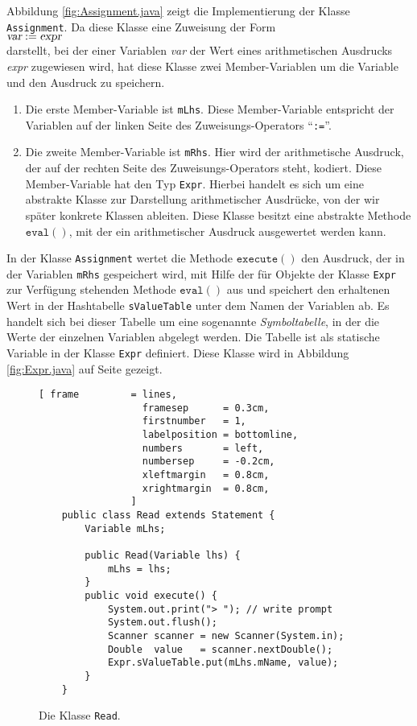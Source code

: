 Abbildung \ref{fig:Assignment.java} zeigt die Implementierung der Klasse \texttt{Assignment}.  Da
diese Klasse eine Zuweisung der Form
\\[0.2cm]
\hspace*{1.3cm} $\textsl{var} \;\mathtt{:=}\; \textsl{expr}$
\\[0.2cm]
darstellt, bei der einer Variablen \textsl{var} der Wert eines arithmetischen Ausdrucks
\textsl{expr} zugewiesen wird, hat diese Klasse zwei Member-Variablen um die Variable und den
Ausdruck zu speichern.  
\begin{enumerate}
\item Die erste Member-Variable ist \texttt{mLhs}.  Diese
      Member-Variable entspricht der Variablen auf der linken Seite des Zuweisungs-Operators
      ``\texttt{:=}''.
\item Die zweite Member-Variable ist \texttt{mRhs}.  Hier wird der arithmetische Ausdruck,
      der auf der rechten Seite des Zuweisungs-Operators steht, kodiert.  Diese
      Member-Variable hat den Typ \texttt{Expr}.  Hierbei handelt es sich um eine
      abstrakte Klasse zur Darstellung arithmetischer Ausdr\"ucke, von der wir sp\"ater
      konkrete Klassen ableiten.  Diese Klasse besitzt eine abstrakte Methode
      $\texttt{eval}()$, mit der ein arithmetischer Ausdruck ausgewertet werden kann.
\end{enumerate}
In der Klasse \texttt{Assignment} wertet die Methode $\texttt{execute}()$ den Ausdruck,
der in der Variablen \texttt{mRhs} gespeichert wird, mit Hilfe  der f\"ur Objekte der Klasse
\texttt{Expr} zur Verf\"ugung stehenden 
Methode $\texttt{eval}()$ aus und speichert den erhaltenen Wert in der Hashtabelle
\texttt{sValueTable} unter dem Namen der Variablen ab. 
Es handelt sich bei dieser Tabelle um eine sogenannte \emph{Symboltabelle}, in der die
Werte der einzelnen Variablen abgelegt werden.
Die Tabelle ist als statische Variable in der Klasse \texttt{Expr} definiert.
Diese Klasse wird in Abbildung \ref{fig:Expr.java} auf Seite \pageref{fig:Expr.java} gezeigt.


\begin{figure}[!ht]
\centering
\begin{Verbatim}[ frame         = lines, 
                  framesep      = 0.3cm, 
                  firstnumber   = 1,
                  labelposition = bottomline,
                  numbers       = left,
                  numbersep     = -0.2cm,
                  xleftmargin   = 0.8cm,
                  xrightmargin  = 0.8cm,
                ]
    public class Read extends Statement {
        Variable mLhs;
        
        public Read(Variable lhs) {
            mLhs = lhs;
        }
        public void execute() {
            System.out.print("> "); // write prompt
            System.out.flush();
            Scanner scanner = new Scanner(System.in);
            Double  value   = scanner.nextDouble();
            Expr.sValueTable.put(mLhs.mName, value);
        }    
    }
\end{Verbatim}
\vspace*{-0.3cm}
\caption{Die Klasse \texttt{Read}.}
\label{fig:Read.java}
\end{figure}

